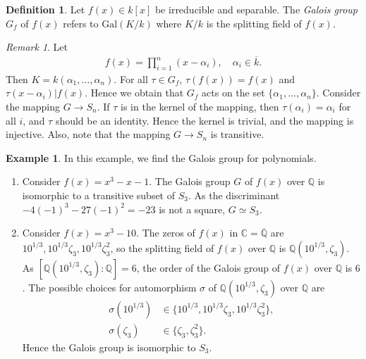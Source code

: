 \documentclass[12pt]{report}
\theoremstyle{plain}
\theoremstyle{remark}
\newtheorem*{remark}{Remark}
\theoremstyle{definition}
\newtheorem{definition}[theorem]{Definition}
\newtheorem{example}[theorem]{Example}
\newcommand{\Q}{\mathbb{Q}}
\newcommand{\C}{\mathbb{C}}
\begin{document}
\begin{definition}
    Let $f(x)\in k[x]$ be irreducible and separable. The \emph{Galois group} $G_f$ of $f(x)$ refers to $\mathrm{Gal}(K/k)$ where $K/k$ is the splitting field of $f(x)$.
\end{definition}
\begin{remark}
    Let
    \begin{align*}
        f(x)=\prod_{i=1}^n (x-\alpha_i),\quad \alpha_i\in \overline{k}.
    \end{align*}
    Then $K=k(\alpha_1,\dots,\alpha_n)$. For all $\tau\in G_f$, $\tau(f(x))=f(x)$ and $\tau(x-\alpha_i)|f(x)$. Hence we obtain that $G_f$ acts on the set $\{\alpha_1,\dots,\alpha_n\}$. Consider the mapping $G\rightarrow S_n$. If $\tau$ is in the kernel of the mapping, then $\tau(\alpha_i)=\alpha_i$ for all $i$, and $\tau$ should be an identity. Hence the kernel is trivial, and the mapping is injective. Also, note that the mapping $G\rightarrow S_n$ is transitive.
\end{remark}

\begin{example}
    In this example, we find the Galois group for polynomials.
    \begin{enumerate}
        \item Consider $f(x) = x^3-x-1$. The Galois group $G$ of $f(x)$ over $\Q$ is isomorphic to a transitive subset of $S_3$. As the discriminant $-4(-1)^3 - 27(-1)^2 = -23$ is not a square, $G\simeq S_3$.
        \item Consider $f(x) = x^3-10$. The zeros of $f(x)$ in $\C=\overline{\Q}$ are $10^{1/3}, 10^{1/3}\zeta_3,10^{1/3}\zeta_3^2$, so the splitting field of $f(x)$ over $\Q$ is $\Q(10^{1/3},\zeta_3)$. As $[\Q(10^{1/3},\zeta_3):\Q]=6$, the order of the Galois group of $f(x)$ over $\Q$ is $6$. The possible choices for automorphism $\sigma$ of $\Q(10^{1/3},\zeta_3)$ over $\Q$ are
        \begin{align*}
            \sigma(10^{1/3}) &\in \{ 10^{1/3},10^{1/3}\zeta_3,10^{1/3}\zeta_3^2 \}, \\
            \sigma(\zeta_3) &\in \{ \zeta_3, \zeta_3^2 \}.
        \end{align*}
        Hence the Galois group is isomorphic to $S_3$.
    \end{enumerate}
\end{example}
\end{document}
